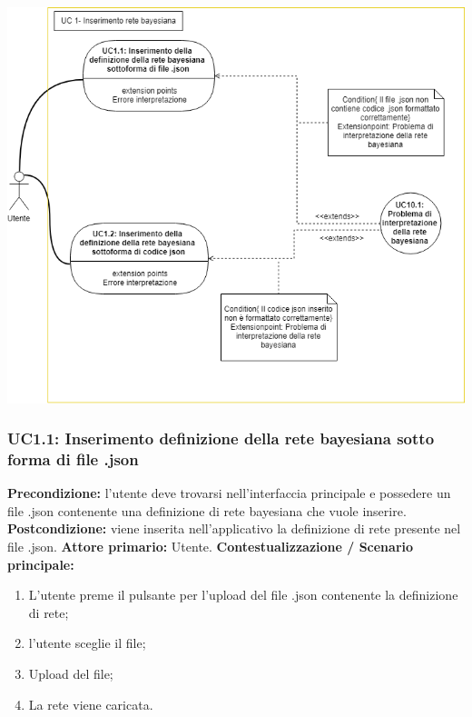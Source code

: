                 \includegraphics[width=\textwidth]{UC1.png}
                        
                \subsubsection{UC1.1: Inserimento definizione della rete bayesiana sotto forma di file .json}
                    \textbf{Precondizione:}  l’utente deve trovarsi nell’interfaccia principale e possedere un file .json contenente una definizione di rete bayesiana che vuole inserire.
                    \newline
                    \textbf{Postcondizione:} viene inserita nell’applicativo la definizione di rete presente nel file .json.
                    \newline
                    \textbf{Attore primario:} Utente.
                    \newline
                    \textbf{Contestualizzazione / Scenario principale:} \begin{enumerate}
                        \item L’utente preme il pulsante per l’upload del file .json contenente la definizione di rete;
                        \item l’utente sceglie il file;
                        \item Upload del file;
                        \item La rete viene caricata.
                    \end{enumerate}
                    
